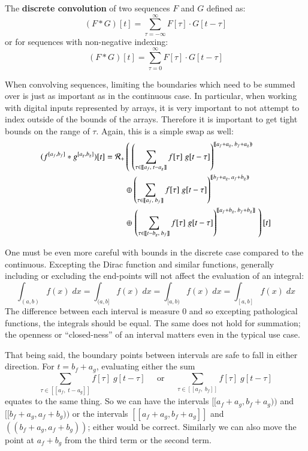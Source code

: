 \begin{definition}
	The \textbf{discrete convolution} of two sequences $F$ and $G$ defined as:
	\begin{equation}
		(F*G)[t] = \sum_{\tau=-\infty}^\infty F[\tau] \cdot G[t-\tau]
	\end{equation}
	or for sequences with non-negative indexing:
	\begin{equation}
		(F*G)[t] = \sum_{\tau=0}^\infty F[\tau] \cdot G[t-\tau]
	\end{equation}
\end{definition}

When convolving sequences, limiting the boundaries which need to be summed over is just as important as in the
continuous case.
In particular, when working with digital inputs represented by arrays, it is very important to not attempt to index outside of
the bounds of the arrays.
Therefore it is important to get tight bounds on the range of $\tau$.
Again, this is a simple swap as well:
\begin{align}
	(f^{[a_f,b_f]} * g^{[a_g, b_g]})[t] = 
		\R[+] &\left( \; \left( 
			\sum_{\tau \in [\![a_f,\;t-a_g]\!]} f[\tau] \; g[t-\tau] \right)^{[\![a_f+a_g,\; b_f+a_g)\!)} 
				\right. \notag \\ &\oplus \left( 
			\sum_{\tau \in [\![a_f,\;b_f]\!]} f[\tau] \; g[t-\tau] \right)^{[\![b_f+a_g,\; a_f+b_g)\!)} 
				\notag \\ &\oplus \left. \left( 
			\sum_{\tau \in [\![t-b_g,\;b_f]\!]} f[\tau] \; g[t-\tau] \right)^{[\![a_f+b_g,\; b_f+b_g]\!]} 
				\; \right)[t]
\end{align}

One must be even more careful with bounds in the discrete case compared to the continuous.
Excepting the Dirac function and similar functions, generally including or excluding the end-points will not affect the
 evaluation of an integral:
\begin{equation*}
	\int_{(a,b)} f(x)\; dx = \int_{(a,b]}f(x)\; dx = \int_{[a,b)} f(x)\; dx = \int_{[a,b]} f(x)\;dx
\end{equation*}
The difference between each interval is measure 0 and so excepting pathological functions, the integrals should be equal.
The same does not hold for summation; the openness or ``closed-ness'' of an interval matters even in the typical use case.


That being said, the boundary points between intervals are safe to fall in either direction.
For $t=b_f+a_g$, evaluating either the sum
\begin{equation*}
	\sum_{\tau \in [\![a_f,\;t-a_g]\!]} f[\tau] \; g[t-\tau] 
	\;\;\;\;\; \text{or} \;\;\;\;\; 
	\sum_{\tau \in [\![a_f,\;b_f]\!]} f[\tau] \; g[t-\tau]
\end{equation*}
equates to the same thing.
So we can have the intervals $[\![a_f+a_g, b_f+a_g)\!)$ and $[\![b_f+a_g,a_f+b_g)\!)$ or the intervals 
$[\![a_f+a_g, b_f+a_g]\!]$ and $(\!(b_f+a_g,a_f+b_g)\!)$; either would be correct.
Similarly we can also move the point at $a_f+b_g$ from the third term or the second term.


